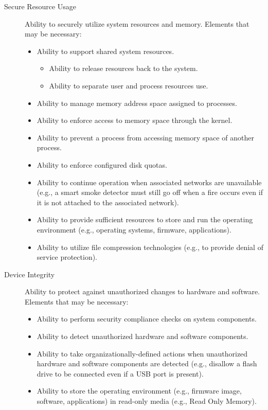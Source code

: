 \begin{description}
        \item[Secure Resource Usage] Ability to securely utilize system resources and memory. Elements that may be necessary:
        \begin{itemize}
            \item Ability to support shared system resources.
            \begin{itemize}
                \item Ability to release resources back to the system.
                \item Ability to separate user and process resources use.
            \end{itemize}
            \item Ability to manage memory address space assigned to processes.
            \item Ability to enforce access to memory space through the kernel.
            \item Ability to prevent a process from accessing memory space of another process.
            \item Ability to enforce configured disk quotas.
            \item Ability to continue operation when associated networks are unavailable (e.g., a smart smoke detector must still go off when a fire occurs even if it is not attached to the associated network).
            \item Ability to provide sufficient resources to store and run the operating environment (e.g., operating systems, firmware, applications).
            \item Ability to utilize file compression technologies (e.g., to provide denial of service protection).
        \end{itemize}
        
        
        \item[Device Integrity] Ability to protect against unauthorized changes to hardware and software. Elements that may be necessary:
        \begin{itemize}
            \item Ability to perform security compliance checks on system components.
            \item Ability to detect unauthorized hardware and software components.
            \item Ability to take organizationally-defined actions when unauthorized hardware and software components are detected (e.g., disallow a flash drive to be connected even if a USB port is present).
            \item Ability to store the operating environment (e.g., firmware image, software, applications) in read-only media (e.g., Read Only Memory).
        \end{itemize}
        

\end{description}
